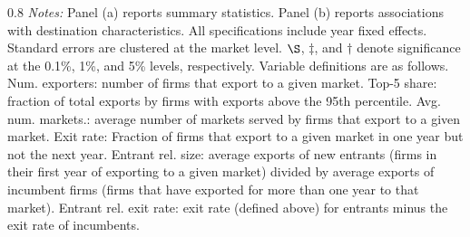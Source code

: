 \begin{table}[h!]
\begin{center}
\begin{fignote2}{0.8\textwidth}
\textit{Notes:} Panel (a) reports summary statistics. Panel (b) reports associations with destination characteristics. All specifications include year fixed effects. Standard errors are clustered at the market level. $\S$, $\ddagger$, and $\dagger$ denote significance at the 0.1\%, 1\%, and 5\% levels, respectively. Variable definitions are as follows. Num. exporters: number of firms that export to a given market. Top-5 share: fraction of total exports by firms with exports above the 95th percentile. Avg. num. markets.: average number of markets served by firms that export to a given market. Exit rate: Fraction of firms that export to a given market in one year but not the next year. Entrant rel. size: average exports of new entrants (firms in their first year of exporting to a given market) divided by average exports of incumbent firms (firms that have exported for more than one year to that market). Entrant rel. exit rate: exit rate (defined above) for entrants minus the exit rate of incumbents.
\end{fignote2}
\end{center}
\normalsize
\end{table}
